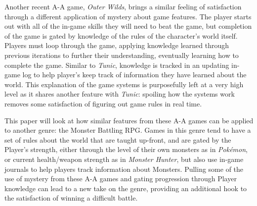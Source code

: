 Another recent \ac{A-A} game, \textit{Outer Wilds}, brings a similar feeling of satisfaction through a different application of mystery about game features. The player starts out with all of the in-game skills they will need to beat the game, but completion of the game is gated by knowledge of the rules of the character's world itself. Players must loop through the game, applying knowledge learned through previous iterations to further their understanding, eventually learning how to complete the game. Similar to \textit{Tunic}, knowledge is tracked in an updating in-game log to help player's keep track of information they have learned about the world. This explanation of the game systems is purposefully left at a very high level as it shares another feature with \textit{Tunic}: spoiling how the systems work removes some satisfaction of figuring out game rules in real time.

This paper will look at how similar features from these \ac{A-A} games can be applied to another genre: the Monster Battling \ac{RPG}. Games in this genre tend to have a set of rules about the world that are taught up-front, and are gated by the Player's strength, either through the level of their own monsters as in \textit{Pok\'emon}, or current health/weapon strength as in \textit{Monster Hunter}, but also use in-game journals to help players track information about Monsters. Pulling some of the use of mystery from these \ac{A-A} games and gating progression through Player knowledge can lead to a new take on the genre, providing an additional hook to the satisfaction of winning a difficult battle.
